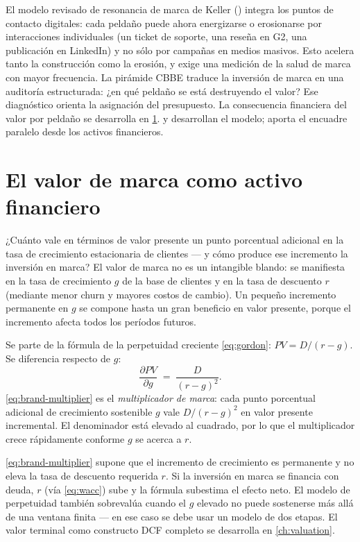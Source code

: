 El modelo revisado de resonancia de marca de Keller (\textcite{keller2019}) integra los puntos de contacto digitales: cada peldaño puede ahora energizarse o erosionarse por interacciones individuales (un ticket de soporte, una reseña en G2, una publicación en LinkedIn) y no sólo por campañas en medios masivos. Esto acelera tanto la construcción como la erosión, y exige una medición de la salud de marca con mayor frecuencia. La pirámide CBBE traduce la inversión de marca en una auditoría estructurada: ¿en qué peldaño se está destruyendo el valor? Ese diagnóstico orienta la asignación del presupuesto. La consecuencia financiera del valor por peldaño se desarrolla en \cref{sec:brand-multiplier}. \textcite{keller1993customer} y \textcite{keller2019} desarrollan el modelo; \textcite{aaker1996} aporta el encuadre paralelo desde los activos financieros.

\section{El valor de marca como activo financiero}\label{sec:brand-multiplier}

¿Cuánto vale en términos de valor presente un punto porcentual adicional en la tasa de crecimiento estacionaria de clientes --- y cómo produce ese incremento la inversión en marca? El valor de marca no es un intangible blando: se manifiesta en la tasa de crecimiento \(g\) de la base de clientes y en la tasa de descuento \(r\) (mediante menor churn y mayores costos de cambio). Un pequeño incremento permanente en \(g\) se compone hasta un gran beneficio en valor presente, porque el incremento afecta todos los períodos futuros.

Se parte de la fórmula de la perpetuidad creciente \cref{eq:gordon}: \(PV = D/(r-g)\). Se diferencia respecto de \(g\):
\begin{equation}\label{eq:brand-multiplier}
  \frac{\partial PV}{\partial g} \;=\; \frac{D}{(r-g)^{2}} .
\end{equation}
\cref{eq:brand-multiplier} es el \emph{multiplicador de marca}: cada punto porcentual adicional de crecimiento sostenible \(g\) vale \(D/(r-g)^2\) en valor presente incremental. El denominador está elevado al cuadrado, por lo que el multiplicador crece rápidamente conforme \(g\) se acerca a \(r\).

\cref{eq:brand-multiplier} supone que el incremento de crecimiento es permanente y no eleva la tasa de descuento requerida \(r\). Si la inversión en marca se financia con deuda, \(r\) (vía \cref{eq:wacc}) sube y la fórmula subestima el efecto neto. El modelo de perpetuidad también sobrevalúa cuando el \(g\) elevado no puede sostenerse más allá de una ventana finita --- en ese caso se debe usar un modelo de dos etapas. El valor terminal como constructo DCF completo se desarrolla en \cref{ch:valuation}.


